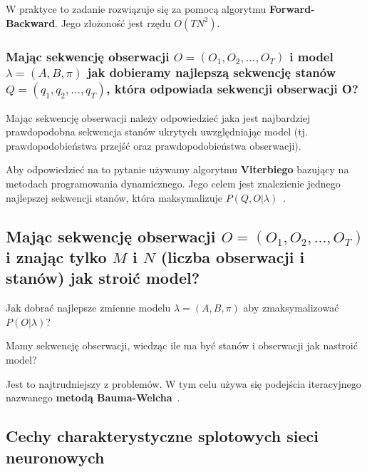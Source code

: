 \documentclass[wi]{zut}
\begin{document}
W praktyce to zadanie rozwiązuje się za pomocą algorytmu \textbf{Forward-Backward}. Jego złożoność jest rzędu $O(TN^2)$\cite{Pietrzykowski2020}.

\subsubsection{Mając sekwencję obserwacji $O = (O_1, O_2, \ldots, O_T)$ i model $\lambda = (A, B, \pi)$ jak dobieramy najlepszą sekwencję stanów $Q = (q_1, q_2, \ldots, q_T)$, która odpowiada sekwencji obserwacji O?}

Mając sekwencję obserwacji należy odpowiedzieć jaka jest najbardziej prawdopodobna sekwencja stanów ukrytych uwzględniając model (tj. prawdopodobieństwa przejść oraz prawdopodobieństwa obserwacji).

Aby odpowiedzieć na to pytanie używamy algorytmu \textbf{Viterbiego} bazujący na metodach programowania dynamicznego. Jego celem jest znalezienie jednego najlepszej sekwencji stanów, która maksymalizuje $P(Q, O|\lambda)$~\cite{Pietrzykowski2020}.

\subsection{Mając sekwencję obserwacji $O = (O_1, O_2, \ldots, O_T)$ i znając tylko $M$ i $N$ (liczba obserwacji i stanów) jak stroić model?}

Jak dobrać najlepsze zmienne modelu $\lambda = (A, B, \pi)$ aby zmaksymalizować $P(O|\lambda)$?

Mamy sekwencję obserwacji, wiedząc ile ma być stanów i obserwacji jak nastroić model?

Jest to najtrudniejszy z problemów. W tym celu używa się podejścia iteracyjnego nazwanego \textbf{metodą Bauma-Welcha}~\cite{Pietrzykowski2020}.



\subsection{Cechy charakterystyczne splotowych sieci neuronowych}
\end{document}
